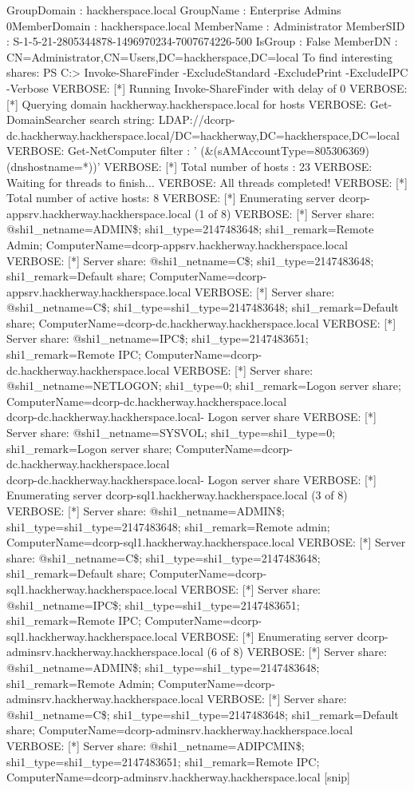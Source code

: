 {{GroupDomain         : hackherspace.local
GroupName           : Enterprise Admins
0MemberDomain       : hackherspace.local
MemberName          : Administrator
MemberSID           : S-1-5-21-2805344878-1496970234-7007674226-500
IsGroup             : False
MemberDN            : CN=Administrator,CN=Users,DC=hackherspace,DC=local
}
To find interesting shares:
PS C:\MyDrive\MyTools> Invoke-ShareFinder -ExcludeStandard -ExcludePrint -ExcludeIPC -Verbose
VERBOSE: [*] Running Invoke-ShareFinder with delay of 0
VERBOSE: [*] Querying domain hackherway.hackherspace.local for hosts
VERBOSE: Get-DomainSearcher search string: LDAP://dcorp-dc.hackherway.hackherspace.local/DC=hackherway,DC=hackherspace,DC=local
VERBOSE: Get-NetComputer filter : ' (\&(sAMAccountType=805306369) (dnshostname=*))'
VERBOSE: [*] Total number of hosts : 23
VERBOSE: Waiting for threads to finish...
VERBOSE: All threads completed!
VERBOSE: [*] Total number of active hosts: 8
VERBOSE: [*] Enumerating server dcorp-appsrv.hackherway.hackherspace.local (1 of 8)
VERBOSE: [*] Server share: @{shi1_netname=ADMIN\$; shi1_type=2147483648; shi1_remark=Remote Admin; ComputerName=dcorp-appsrv.hackherway.hackherspace.local}
VERBOSE: [*] Server share: @shi1_netname=C\$; shi1_type=2147483648; shi1_remark=Default share; ComputerName=dcorp-appsrv.hackherway.hackherspace.local
{VERBOSE: [*] Server share: @{shi1_netname=C\$; shi1_type=shi1_type=2147483648; shi1_remark=Default share; ComputerName=dcorp-dc.hackherway.hackherspace.local}
VERBOSE: [*] Server share: @{shi1_netname=IPC\$; shi1_type=2147483651; shi1_remark=Remote IPC; ComputerName=dcorp-dc.hackherway.hackherspace.local}
VERBOSE: [*] Server share: @{shi1_netname=NETLOGON; shi1_type=0; shi1_remark=Logon server share; ComputerName=dcorp-dc.hackherway.hackherspace.local}
\\dcorp-dc.hackherway.hackherspace.local\NETLOGON - Logon server share
VERBOSE: [*] Server share: @{shi1_netname=SYSVOL; shi1_type=shi1_type=0; shi1_remark=Logon server share; ComputerName=dcorp-dc.hackherway.hackherspace.local}
\\dcorp-dc.hackherway.hackherspace.local\SYSVOL - Logon server share
VERBOSE: [*] Enumerating server dcorp-sql1.hackherway.hackherspace.local (3 of 8)
VERBOSE: [*] Server share: @{shi1_netname=ADMIN\$; shi1_type=shi1_type=2147483648; shi1_remark=Remote admin; ComputerName=dcorp-sql1.hackherway.hackherspace.local}
VERBOSE: [*] Server share: @{shi1_netname=C\$; shi1_type=shi1_type=2147483648; shi1_remark=Default share; ComputerName=dcorp-sql1.hackherway.hackherspace.local}
VERBOSE: [*] Server share: @{shi1_netname=IPC\$; shi1_type=shi1_type=2147483651; shi1_remark=Remote IPC; ComputerName=dcorp-sql1.hackherway.hackherspace.local}
VERBOSE: [*] Enumerating server dcorp-adminsrv.hackherway.hackherspace.local (6 of 8)
VERBOSE: [*] Server share: @{shi1_netname=ADMIN\$; shi1_type=shi1_type=2147483648; shi1_remark=Remote Admin; ComputerName=dcorp-adminsrv.hackherway.hackherspace.local}
VERBOSE: [*] Server share: @{shi1_netname=C\$; shi1_type=shi1_type=2147483648; shi1_remark=Default share; ComputerName=dcorp-adminsrv.hackherway.hackherspace.local}
VERBOSE: [*] Server share: @{shi1_netname=ADIPCMIN\$; shi1_type=shi1_type=2147483651; shi1_remark=Remote IPC; ComputerName=dcorp-adminsrv.hackherway.hackherspace.local}
[snip]
}
}
